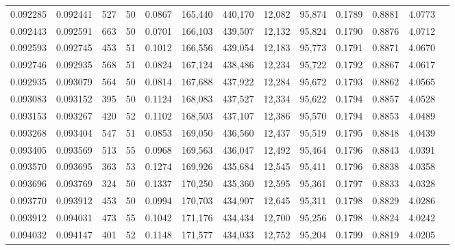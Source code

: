 \begin{tabular}{rrrrrrrrrrrrr}
0.092285 & 0.092441 &   527 &  50 &                                     0.0867 & 165,440 & 440,170 &  12,082 &  95,874 & 0.1789 & 0.8881 & 4.0773 \\
0.092443 & 0.092591 &   663 &  50 &                                     0.0701 & 166,103 & 439,507 &  12,132 &  95,824 & 0.1790 & 0.8876 & 4.0712 \\
0.092593 & 0.092745 &   453 &  51 &                                     0.1012 & 166,556 & 439,054 &  12,183 &  95,773 & 0.1791 & 0.8871 & 4.0670 \\
0.092746 & 0.092935 &   568 &  51 &                                     0.0824 & 167,124 & 438,486 &  12,234 &  95,722 & 0.1792 & 0.8867 & 4.0617 \\
0.092935 & 0.093079 &   564 &  50 &                                     0.0814 & 167,688 & 437,922 &  12,284 &  95,672 & 0.1793 & 0.8862 & 4.0565 \\
0.093083 & 0.093152 &   395 &  50 &                                     0.1124 & 168,083 & 437,527 &  12,334 &  95,622 & 0.1794 & 0.8857 & 4.0528 \\
0.093153 & 0.093267 &   420 &  52 &                                     0.1102 & 168,503 & 437,107 &  12,386 &  95,570 & 0.1794 & 0.8853 & 4.0489 \\
0.093268 & 0.093404 &   547 &  51 &                                     0.0853 & 169,050 & 436,560 &  12,437 &  95,519 & 0.1795 & 0.8848 & 4.0439 \\
0.093405 & 0.093569 &   513 &  55 &                                     0.0968 & 169,563 & 436,047 &  12,492 &  95,464 & 0.1796 & 0.8843 & 4.0391 \\
0.093570 & 0.093695 &   363 &  53 &                                     0.1274 & 169,926 & 435,684 &  12,545 &  95,411 & 0.1796 & 0.8838 & 4.0358 \\
0.093696 & 0.093769 &   324 &  50 &                                     0.1337 & 170,250 & 435,360 &  12,595 &  95,361 & 0.1797 & 0.8833 & 4.0328 \\
0.093770 & 0.093912 &   453 &  50 &                                     0.0994 & 170,703 & 434,907 &  12,645 &  95,311 & 0.1798 & 0.8829 & 4.0286 \\
0.093912 & 0.094031 &   473 &  55 &                                     0.1042 & 171,176 & 434,434 &  12,700 &  95,256 & 0.1798 & 0.8824 & 4.0242 \\
0.094032 & 0.094147 &   401 &  52 &                                     0.1148 & 171,577 & 434,033 &  12,752 &  95,204 & 0.1799 & 0.8819 & 4.0205 \\

\end{tabular}

